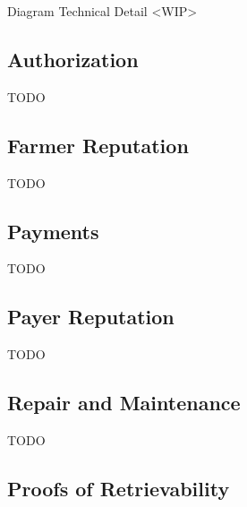 \documentclass[a4paper,10pt]{article}
\newcommand{\todo}[1]{{\color{red} TODO #1}}
\begin{document}
Diagram Technical Detail
<WIP>

\subsection{Authorization}

\todo{}

\subsection{Farmer Reputation}

\todo{}

\subsection{Payments}

\todo{}

\subsection{Payer Reputation}

\todo{}

\subsection{Repair and Maintenance}

\todo{}

\subsection{Proofs of Retrievability}
\end{document}
